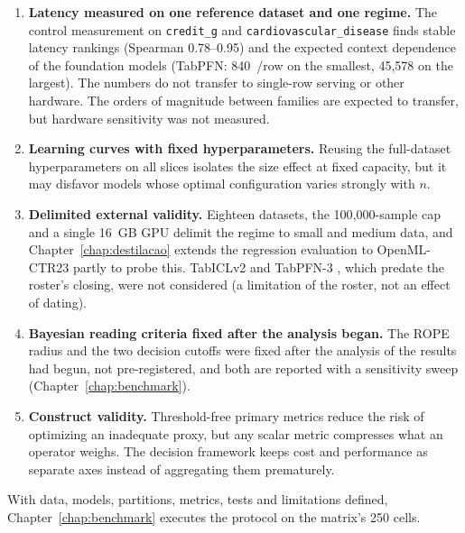 \begin{enumerate}
    \texttt{helena} instead would hide the kind of architectural
    restriction a study of practical decision-making should expose.
  \item \textbf{Latency measured on one reference dataset and one
    regime.} The control measurement on \texttt{credit\_g} and
    \texttt{cardiovascular\_\allowbreak disease} finds stable
    latency rankings (Spearman 0.78--0.95) and the expected context
    dependence of the foundation models (TabPFN: 840~\us/row on the
    smallest, 45{,}578 on the largest). The numbers do not transfer
    to single-row serving or other hardware. The orders of magnitude between families are expected to transfer, but
    hardware sensitivity was not measured.
  \item \textbf{Learning curves with fixed hyperparameters.}
    Reusing the full-dataset hyperparameters on all slices isolates
    the size effect at fixed capacity, but it may disfavor
    models whose optimal configuration varies strongly with $n$.
  \item \textbf{Delimited external validity.} Eighteen datasets, the
    100{,}000-sample cap and a single 16~GB GPU delimit the regime
    to small and medium data, and Chapter~\ref{chap:destilacao}
    extends the regression evaluation to OpenML-CTR23 partly to
    probe this. TabICLv2 and TabPFN-3
    \citep{tabiclv2-2026,tabpfn3-2026}, which predate the roster's
    closing, were not considered (a limitation of the roster, not an effect of dating).
  \item \textbf{Bayesian reading criteria fixed after the analysis
    began.} The ROPE radius and the two decision cutoffs were fixed
    after the analysis of the results had begun, not pre-registered,
    and both are reported with a sensitivity sweep
    (Chapter~\ref{chap:benchmark}).
  \item \textbf{Construct validity.} Threshold-free primary metrics
    reduce the risk of optimizing an inadequate proxy, but any
    scalar metric compresses what an operator weighs. The decision
    framework keeps cost and performance as separate axes instead of
    aggregating them prematurely.
\end{enumerate}

With data, models, partitions, metrics, tests and limitations
defined, Chapter~\ref{chap:benchmark} executes the protocol on the
matrix's 250 cells.
